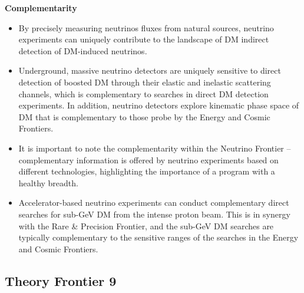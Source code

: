 \documentclass[nofootinbib]{article}
\begin{document}
\vspace{1em}
\noindent
{\bf Complementarity}
\begin{itemize}
\item By precisely measuring neutrinos fluxes from natural sources, neutrino experiments can uniquely contribute to the landscape of DM indirect detection of DM-induced neutrinos.
\item Underground, massive neutrino detectors are uniquely sensitive to direct detection of boosted DM through their elastic and inelastic scattering channels, which is complementary to searches in direct DM detection experiments. In addition, neutrino detectors explore kinematic phase space of DM that is complementary to those probe by the Energy and Cosmic Frontiers.
\item It is important to note the complementarity within the Neutrino Frontier -- complementary information is offered by neutrino experiments based on different technologies, highlighting the importance of a program with a healthy breadth.
\item Accelerator-based neutrino experiments can conduct complementary direct searches for sub-GeV DM from the intense proton beam. This is in synergy with the Rare \& Precision Frontier, and the sub-GeV DM searches are typically complementary to the sensitive ranges of the searches in the Energy and Cosmic Frontiers.

\end{itemize}

\subsection{Theory Frontier 9}

\end{document}
